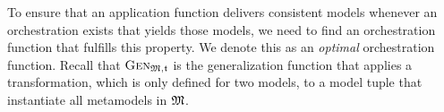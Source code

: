 To ensure that an application function delivers consistent models whenever an orchestration exists that yields those models, we need to find an orchestration function that fulfills this property.
We denote this as an \emph{optimal} orchestration function.
Recall that $\textsc{Gen}_{\mathfrak{M},\mathfrak{t}}$ is the generalization function that applies a transformation, which is only defined for two models, to a model tuple that instantiate all metamodels in $\mathfrak{M}$.



